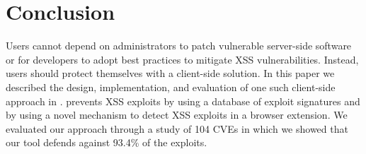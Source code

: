 \section{Conclusion}

Users cannot depend on administrators to patch vulnerable server-side
software or for developers to adopt best practices to mitigate XSS
vulnerabilities. Instead, users should protect themselves with a
client-side solution. In this paper we described the design,
implementation, and evaluation of one such client-side approach in
\sys.
%
\sys prevents \ac{XSS} exploits by using a database of exploit
signatures and by using a novel mechanism to detect XSS exploits in a
browser extension.
%
We evaluated our approach through a study of 104 CVEs in which we
showed that our tool defends against 93.4\% of the exploits.




